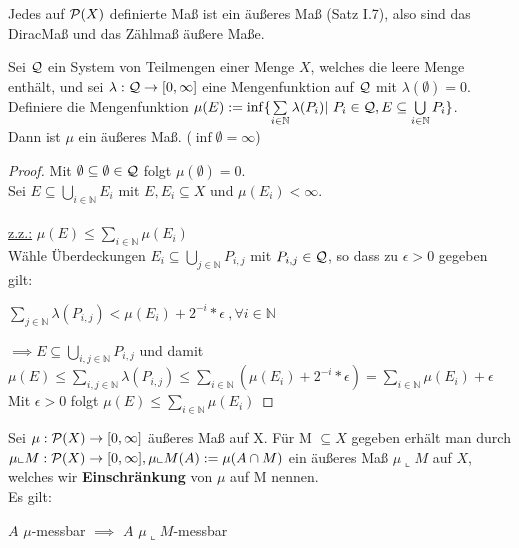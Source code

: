   \begin{example}
    Jedes auf $\mathcal{P}(X)$ definierte Maß ist ein äußeres Maß (Satz I.7), also sind das DiracMaß und das Zählmaß äußere Maße.
  \end{example}

  \newpage
  \begin{theorem}
    Sei $\mathcal{Q}$ ein System von Teilmengen einer Menge $X$, welches die leere Menge enthält, und sei $\lambda: \mathcal{Q} \to [0,\infty]$ eine Mengenfunktion auf $\mathcal{Q}$ mit $\lambda(\emptyset)=0$. Definiere die Mengenfunktion $\mu(E):= \inf\{\sum\limits_{i \in \mathbb{N}} \lambda(P_i) |\ P_i \in \mathcal{Q}, E \subseteq \bigcup\limits_{i \in \mathbb{N}} P_i\}$.\\
    Dann ist $\mu$ ein äußeres Maß. \hfill ($\inf \emptyset = \infty$)
  \end{theorem}

  \begin{proof}
    Mit $\emptyset \subseteq \emptyset \in \mathcal{Q}$ folgt $\mu(\emptyset) = 0$.\\
    Sei $E \subseteq \bigcup\limits_{i \in \mathbb{N}} E_i$ mit $E, E_i \subseteq X$ und $\mu(E_i) < \infty$.\\ \\
    \underline{z.z.:} $\mu(E) \leq \sum\limits_{i \in \mathbb{N}} \mu(E_i)$\\
    Wähle Überdeckungen $E_i \subseteq \bigcup\limits_{j \in \mathbb{N}} P_{i,j}$ mit $P_{i,j} \in \mathcal{Q}$, so dass zu $\epsilon > 0$ gegeben gilt:
    \begin{center}
      $\sum\limits_{j \in \mathbb{N}} \lambda(P_{i,j}) < \mu(E_i) + 2^{-i} * \epsilon \ , \forall i \in \mathbb{N}$
    \end{center}
    $\implies E \subseteq \bigcup\limits_{i,j \in \mathbb{N}} P_{i,j}$ und damit $\mu(E) \leq \sum\limits_{i,j \in \mathbb{N}} \lambda(P_{i,j}) \leq \sum\limits_{i \in \mathbb{N}} (\mu(E_i) + 2^{-i} * \epsilon) = \sum\limits_{i \in \mathbb{N}} \mu(E_i) + \epsilon$\\
    Mit $\epsilon > 0$ folgt $\mu(E) \leq \sum\limits_{i \in \mathbb{N}} \mu(E_i)$
  \end{proof}

  \begin{theorem}
    Sei $\mu: \mathcal{P}(X) \to [0, \infty]$ äußeres Maß auf X. Für M $\subseteq X$ gegeben erhält man durch $\mu \llcorner M: \mathcal{P}(X) \to [0, \infty], \mu \llcorner M(A) := \mu(A \cap M)$ ein äußeres Maß $\mu \llcorner M$ auf $X$, welches wir \textbf{Einschränkung} von $\mu$ auf M nennen.\\
    Es gilt:
    \begin{center}
      $A$ $\mu$-messbar $\implies$ $A$ $\mu \llcorner M$-messbar
    \end{center} 
  \end{theorem}

